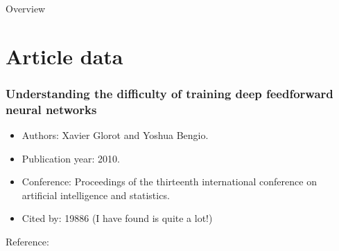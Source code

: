 


\begin{frame}{Overview}
  \tableofcontents
\end{frame}
\section{Article data}

\begin{frame}
    \frametitle{Understanding the difficulty of training deep feedforward neural networks}
      \begin{itemize}
        \item Authors: Xavier Glorot and Yoshua Bengio.
        \item Publication year: 2010.
        \item Conference: Proceedings of the thirteenth international conference on artificial intelligence and statistics.
        \item Cited by: 19886 (I have found is quite a lot!) 
      \end{itemize}
      Reference: \cite{Understanding_the_difficulty_of_training_deep_feedforward_neural_networks}
\end{frame}

